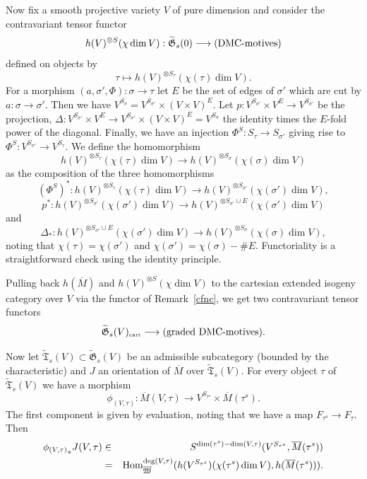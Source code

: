 \documentclass[11pt]{amsart}
\theoremstyle{definition}
\theoremstyle{remark}
\newcommand{\rtext}[1]{\text{\upshape #1}}
\renewcommand{\tilde}{\widetilde}
\newcommand{\cart}{{\mbox{\tiny cart}}}
\newcommand{\upst}{^{\ast}}
\newcommand{\lst}{_{\ast}}
\newcommand{\TT}{{\mathfrak{T}}}
\newcommand{\GG}{{\mathfrak{G}}}
\newcommand{\WW}{{\mathfrak{W}}}
\newcommand{\Hom}{\operatorname{\rm Hom}\nolimits}
\newcommand{\ol}{\overline}
\renewcommand{\t}{_{\tau}}
\newcommand{\s}{_{\sigma}}
\theoremstyle{plain}
\theoremstyle{definition}
\theoremstyle{remark}
\begin{document}
Now fix a smooth projective variety \(V\) of pure dimension and consider the
contravariant tensor functor
\[
h(V)^{\otimes S}{(\chi\dim
V)}:\tilde{\GG}_s(0)\longrightarrow(\rtext{DMC-motives})
\]
defined on objects by
\[
\tau\longmapsto h(V)^{\otimes S\t}({\chi(\tau)\dim V}).
\]
For a morphism \((a,\sigma',\Phi):\sigma\rightarrow\tau\) let \(E\) be the set of
edges of \(\sigma'\) which are cut by
\(a:\sigma\rightarrow\sigma'\). Then we have
\(V^{S\s}=V^{S_{\sigma'}}\times(V\times V)^E\). Let \(p:V^{S_{\sigma'}}\times
V^E\rightarrow V^{S_{\sigma'}}\) be the projection,
\(\Delta:V^{S_{\sigma'}}\times V^E\rightarrow V^{S_{\sigma'}}\times
(V\times V)^E=V^{S\s}\) the identity times the \(E\)-fold power of the diagonal.
Finally, we have an injection
\(\Phi^S:S\t\rightarrow S_{\sigma'}\) giving rise to
\(\Phi^S:V^{S_{\sigma'}}\rightarrow V^{S\t}\). We define the
homomorphism
\[
h(V)^{\otimes S\t}{(\chi(\tau)\dim V)}\longrightarrow h(V)^{\otimes
S\s}{(\chi(\sigma)\dim V)}
\]
as the composition of the three homomorphisms
\[
(\Phi^S)\upst:h(V)^{\otimes S\t}{(\chi(\tau)\dim V)}\longrightarrow
h(V)^{\otimes
S_{\sigma'}}{(\chi(\sigma')\dim V)},
\]
\[
p\upst:h(V)^{\otimes S_{\sigma'}}{(\chi(\sigma')\dim V)}\longrightarrow
h(V)^{\otimes
S_{\sigma'}\cup E}{(\chi(\sigma')\dim V)}
\]
and
\[
\Delta\lst:h(V)^{\otimes S_{\sigma'}\cup E}{(\chi(\sigma')\dim
V)}\longrightarrow h(V)^{\otimes
S\s}{(\chi(\sigma)\dim V)},
\]
noting that \(\chi(\tau)=\chi(\sigma')\) and
\(\chi(\sigma')=\chi(\sigma)-\#
E\). Functoriality is a straightforward check using the identity principle.

Pulling back \(h(\ol{M})\) and \(h(V)^{\otimes S}{(\chi\dim V)}\) to the cartesian
extended isogeny category over \(V\) via the
functor of Remark~\ref{cfnc}, we get two contravariant tensor functors
\[
\tilde{\GG}_s(V)_\cart\longrightarrow(\text{graded DMC-motives}).
\]

Now let \(\tilde{\TT}_s(V)\subset\tilde{\GG}_s(V)\) be an admissible subcategory
(bounded by the characteristic) and \(J\)
an orientation of \(\ol{M}\) over \(\tilde{\TT}_s(V)\). For every object \(\tau\) of
\(\tilde{\TT}_s(V)\) we have a morphism
\[
\phi_{(V,\tau)}:\ol{M}(V,\tau)\longrightarrow V^{S_{\tau^s}}\times
\ol{M}(\tau^s).
\]
The first component is given by evaluation, noting that we have a map
\(F_{\tau^s}\rightarrow F\t\).
Then
\begin{eqnarray*}
{\phi_{(V,\tau)}}\lst J(V,\tau) & \in &
S^{\dim(\tau^s)-\dim(V,\tau)}(V^{S_{\tau^s}},\ol{M}(\tau^s)) \\
 & = & \Hom_{\ol{\WW}}^{\deg(V,\tau)}(h(V^{S_{\tau^s}}){(\chi(\tau^s)\dim
V)},h(\ol{M}(\tau^s))).
\end{eqnarray*}
\end{document}
